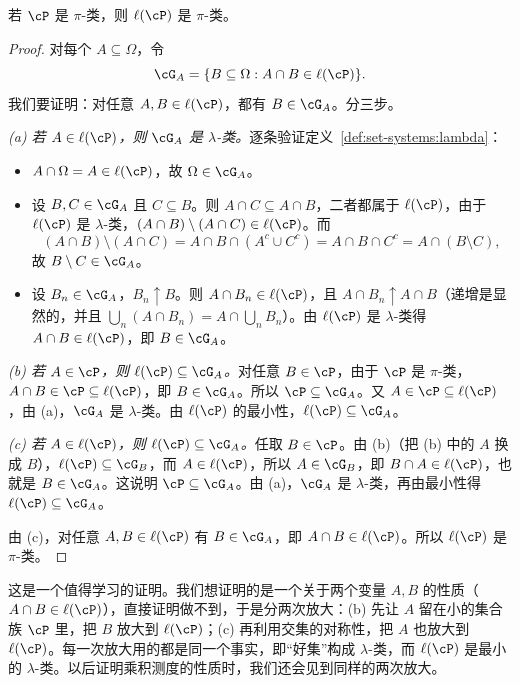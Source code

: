 \begin{lemma}[第二步]\label{lem:set-systems:ell-is-pi}
若 $\cP$ 是 $\pi$-类，则 $\ell(\cP)$ 是 $\pi$-类。
\end{lemma}
\begin{proof}
对每个 $A\subseteq\Omega$，令
\[
\cG_A=\{B\subseteq\Omega: A\cap B\in\ell(\cP)\}.
\]
我们要证明：对任意 $A,B\in\ell(\cP)$，都有 $B\in\cG_A$。分三步。

\emph{(a) 若 $A\in\ell(\cP)$，则 $\cG_A$ 是 $\lambda$-类。}逐条验证定义~\ref{def:set-systems:lambda}：
\begin{itemize}
\item $A\cap\Omega=A\in\ell(\cP)$，故 $\Omega\in\cG_A$。
\item 设 $B,C\in\cG_A$ 且 $C\subseteq B$。则 $A\cap C\subseteq A\cap B$，二者都属于 $\ell(\cP)$，由于 $\ell(\cP)$ 是 $\lambda$-类，$(A\cap B)\setminus(A\cap C)\in\ell(\cP)$。而
\[
(A\cap B)\setminus(A\cap C)=A\cap B\cap(A^c\cup C^c)=A\cap B\cap C^c=A\cap(B\setminus C),
\]
故 $B\setminus C\in\cG_A$。
\item 设 $B_n\in\cG_A$，$B_n\uparrow B$。则 $A\cap B_n\in\ell(\cP)$，且 $A\cap B_n\uparrow A\cap B$（递增是显然的，并且 $\bigcup_n(A\cap B_n)=A\cap\bigcup_nB_n$）。由 $\ell(\cP)$ 是 $\lambda$-类得 $A\cap B\in\ell(\cP)$，即 $B\in\cG_A$。
\end{itemize}

\emph{(b) 若 $A\in\cP$，则 $\ell(\cP)\subseteq\cG_A$。}对任意 $B\in\cP$，由于 $\cP$ 是 $\pi$-类，$A\cap B\in\cP\subseteq\ell(\cP)$，即 $B\in\cG_A$。所以 $\cP\subseteq\cG_A$。又 $A\in\cP\subseteq\ell(\cP)$，由 (a)，$\cG_A$ 是 $\lambda$-类。由 $\ell(\cP)$ 的最小性，$\ell(\cP)\subseteq\cG_A$。

\emph{(c) 若 $A\in\ell(\cP)$，则 $\ell(\cP)\subseteq\cG_A$。}任取 $B\in\cP$。由 (b)（把 (b) 中的 $A$ 换成 $B$），$\ell(\cP)\subseteq\cG_B$，而 $A\in\ell(\cP)$，所以 $A\in\cG_B$，即 $B\cap A\in\ell(\cP)$，也就是 $B\in\cG_A$。这说明 $\cP\subseteq\cG_A$。由 (a)，$\cG_A$ 是 $\lambda$-类，再由最小性得 $\ell(\cP)\subseteq\cG_A$。

由 (c)，对任意 $A,B\in\ell(\cP)$ 有 $B\in\cG_A$，即 $A\cap B\in\ell(\cP)$。所以 $\ell(\cP)$ 是 $\pi$-类。
\end{proof}

这是一个值得学习的证明。我们想证明的是一个关于两个变量 $A,B$ 的性质（$A\cap B\in\ell(\cP)$），直接证明做不到，于是分两次放大：(b) 先让 $A$ 留在小的集合族 $\cP$ 里，把 $B$ 放大到 $\ell(\cP)$；(c) 再利用交集的对称性，把 $A$ 也放大到 $\ell(\cP)$。每一次放大用的都是同一个事实，即“好集”构成 $\lambda$-类，而 $\ell(\cP)$ 是最小的 $\lambda$-类。以后证明乘积测度的性质时，我们还会见到同样的两次放大。

